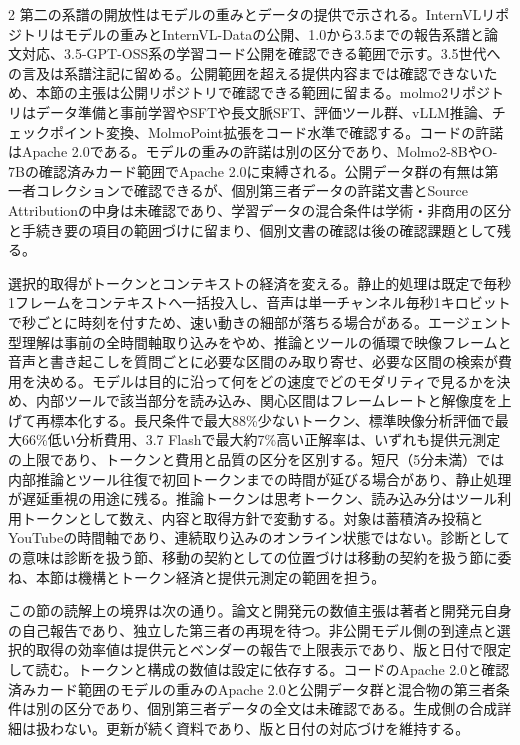 \documentclass[lualatex,a4paper,10pt]{jlreq}
\begin{document}
\begin{multicols}{2}
\noindent 第二の系譜の開放性はモデルの重みとデータの提供で示される。InternVLリポジトリはモデルの重みとInternVL-Dataの公開、1.0から3.5までの報告系譜と論文対応、3.5-GPT-OSS系の学習コード公開を確認できる範囲で示す。3.5世代への言及は系譜注記に留める。公開範囲を超える提供内容までは確認できないため、本節の主張は公開リポジトリで確認できる範囲に留まる。molmo2リポジトリはデータ準備と事前学習やSFTや長文脈SFT、評価ツール群、vLLM推論、チェックポイント変換、MolmoPoint拡張をコード水準で確認する。コードの許諾はApache 2.0である。モデルの重みの許諾は別の区分であり、Molmo2-8BやO-7Bの確認済みカード範囲でApache 2.0に束縛される。公開データ群の有無は第一者コレクションで確認できるが、個別第三者データの許諾文書とSource Attributionの中身は未確認であり、学習データの混合条件は学術・非商用の区分と手続き要の項目の範囲づけに留まり、個別文書の確認は後の確認課題として残る。\autocite{vmd076,vmd077}\par\medskip
\noindent 選択的取得がトークンとコンテキストの経済を変える。静止的処理は既定で毎秒1フレームをコンテキストへ一括投入し、音声は単一チャンネル毎秒1キロビットで秒ごとに時刻を付すため、速い動きの細部が落ちる場合がある。エージェント型理解は事前の全時間軸取り込みをやめ、推論とツールの循環で映像フレームと音声と書き起こしを質問ごとに必要な区間のみ取り寄せ、必要な区間の検索が費用を決める。モデルは目的に沿って何をどの速度でどのモダリティで見るかを決め、内部ツールで該当部分を読み込み、関心区間はフレームレートと解像度を上げて再標本化する。長尺条件で最大88\%少ないトークン、標準映像分析評価で最大66\%低い分析費用、3.7 Flashで最大約7\%高い正解率は、いずれも提供元測定の上限であり、トークンと費用と品質の区分を区別する。短尺（5分未満）では内部推論とツール往復で初回トークンまでの時間が延びる場合があり、静止処理が遅延重視の用途に残る。推論トークンは思考トークン、読み込み分はツール利用トークンとして数え、内容と取得方針で変動する。対象は蓄積済み投稿とYouTubeの時間軸であり、連続取り込みのオンライン状態ではない。診断としての意味は診断を扱う節、移動の契約としての位置づけは移動の契約を扱う節に委ね、本節は機構とトークン経済と提供元測定の範囲を担う。\autocite{vmd112}\par\medskip
\end{multicols}
\begin{claimboundary}[本節の読解上の境界]
\noindent この節の読解上の境界は次の通り。論文と開発元の数値主張は著者と開発元自身の自己報告であり、独立した第三者の再現を待つ。非公開モデル側の到達点と選択的取得の効率値は提供元とベンダーの報告で上限表示であり、版と日付で限定して読む。トークンと構成の数値は設定に依存する。コードのApache 2.0と確認済みカード範囲のモデルの重みのApache 2.0と公開データ群と混合物の第三者条件は別の区分であり、個別第三者データの全文は未確認である。生成側の合成詳細は扱わない。更新が続く資料であり、版と日付の対応づけを維持する。\autocite{vmd065,vmd066,vmd067,vmd068,vmd069,vmd070,vmd071,vmd064,vmd072,vmd073,vmd074,vmd075,vmd076,vmd077,vmd112}\par
\end{claimboundary}
\end{document}
